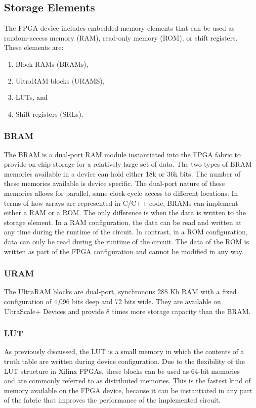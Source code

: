 \clearpage
\subsection{Storage Elements}
The FPGA device includes embedded memory elements that can be used as random-access memory (RAM), read-only memory (ROM), or shift registers. These elements are:

\begin{enumerate}
  \item Block RAMs (BRAMs), 
  \item UltraRAM blocks (URAMS),
  \item LUTs, and 
  \item Shift registers (SRLs).
\end{enumerate} 

\subsubsection{BRAM}
The BRAM is a dual-port RAM module instantiated into the FPGA fabric to provide on-chip storage for a relatively large set of data. The two types of BRAM memories available in a
device can hold either 18k or 36k bits. The number of these memories available is device
specific. The dual-port nature of these memories allows for parallel, same-clock-cycle
access to different locations.
In terms of how arrays are represented in C/C++ code, BRAMs can implement either a RAM
or a ROM. The only difference is when the data is written to the storage element. In a RAM configuration, the data can be read and written at any time during the runtime of the
circuit. In contrast, in a ROM configuration, data can only be read during the runtime of the
circuit. The data of the ROM is written as part of the FPGA configuration and cannot be
modified in any way.

\subsubsection{URAM}
The UltraRAM blocks are dual-port, synchronous 288 Kb RAM with a fixed configuration of
4,096 bits deep and 72 bits wide. They are available on UltraScale+ Devices and provide 8
times more storage capacity than the BRAM.

\subsubsection{LUT}
As previously discussed, the LUT is a small memory in which the contents of a truth table are
written during device configuration. Due to the flexibility of the LUT structure in Xilinx
FPGAs, these blocks can be used as 64-bit memories and are commonly referred to as
distributed memories. This is the fastest kind of memory available on the FPGA device,
because it can be instantiated in any part of the fabric that improves the performance of the
implemented circuit.

